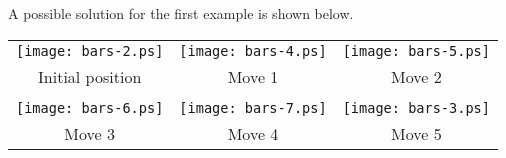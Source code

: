 A possible solution for the first example is shown below.

\begin{center}
\begin{tabular}{ccc}
\texttt{[image: bars-2.ps]} & \texttt{[image: bars-4.ps]} & \texttt{[image: bars-5.ps]} \\
Initial position            & Move 1                      & Move 2\\
&&\\
\texttt{[image: bars-6.ps]} & \texttt{[image: bars-7.ps]} & \texttt{[image: bars-3.ps]} \\
Move 3                      & Move 4                      & Move 5\\
\end{tabular}
\end{center}
